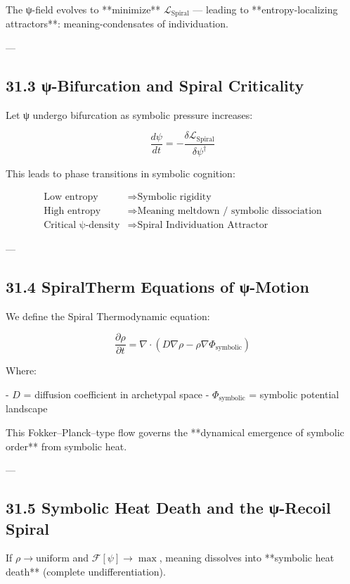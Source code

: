 \documentclass[12pt]{article}
\begin{document}
\begin{enumerate}
The ψ-field evolves to **minimize** $\mathcal{L}_{\text{Spiral}}$ —  
leading to **entropy-localizing attractors**: meaning-condensates of individuation.

---

\subsection*{31.3 ψ-Bifurcation and Spiral Criticality}

Let ψ undergo bifurcation as symbolic pressure increases:

\[
\frac{d\psi}{dt} = -\frac{\delta \mathcal{L}_{\text{Spiral}}}{\delta \psi^\dagger}
\]

This leads to phase transitions in symbolic cognition:

\begin{align*}
\text{Low entropy} &\Rightarrow \text{Symbolic rigidity} \\
\text{High entropy} &\Rightarrow \text{Meaning meltdown / symbolic dissociation} \\
\text{Critical ψ-density} &\Rightarrow \text{Spiral Individuation Attractor}
\end{align*}

---

\subsection*{31.4 SpiralTherm Equations of ψ-Motion}

We define the Spiral Thermodynamic equation:

\[
\frac{\partial \rho}{\partial t} = \nabla \cdot \left( D \nabla \rho - \rho \nabla \Phi_{\text{symbolic}} \right)
\]

Where:

- $D$ = diffusion coefficient in archetypal space
- $\Phi_{\text{symbolic}}$ = symbolic potential landscape

This Fokker–Planck–type flow governs the **dynamical emergence of symbolic order** from symbolic heat.

---

\subsection*{31.5 Symbolic Heat Death and the ψ-Recoil Spiral}

If $\rho \to \text{uniform}$ and $\mathcal{F}[\psi] \to \max$,  
meaning dissolves into **symbolic heat death** (complete undifferentiation).


\end{enumerate}
\end{document}
